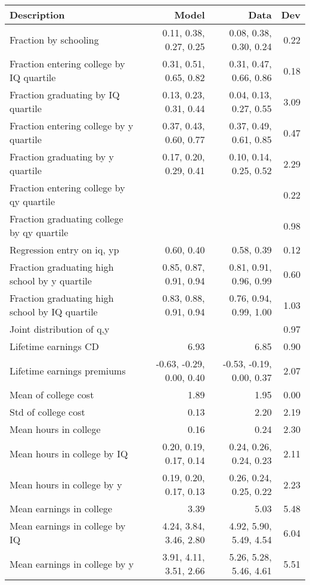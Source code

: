 \begin{tabular}{lrrr}
\hline
Description & Model  & Data  & Dev  \\ 
\hline
Fraction by schooling & 0.11, 0.38, 0.27, 0.25  & 0.08, 0.38, 0.30, 0.24  & 0.22  \\ 
Fraction entering college by IQ quartile & 0.31, 0.51, 0.65, 0.82  & 0.31, 0.47, 0.66, 0.86  & 0.18  \\ 
Fraction graduating by IQ quartile & 0.13, 0.23, 0.31, 0.44  & 0.04, 0.13, 0.27, 0.55  & 3.09  \\ 
Fraction entering college by y quartile & 0.37, 0.43, 0.60, 0.77  & 0.37, 0.49, 0.61, 0.85  & 0.47  \\ 
Fraction graduating by y quartile & 0.17, 0.20, 0.29, 0.41  & 0.10, 0.14, 0.25, 0.52  & 2.29  \\ 
Fraction entering college by qy quartile &   &   & 0.22  \\ 
Fraction graduating college by qy quartile &   &   & 0.98  \\ 
Regression entry on iq, yp & 0.60, 0.40  & 0.58, 0.39  & 0.12  \\ 
Fraction graduating high school by y quartile & 0.85, 0.87, 0.91, 0.94  & 0.81, 0.91, 0.96, 0.99  & 0.60  \\ 
Fraction graduating high school by IQ quartile & 0.83, 0.88, 0.91, 0.94  & 0.76, 0.94, 0.99, 1.00  & 1.03  \\ 
Joint distribution of q,y &   &   & 0.97  \\ 
Lifetime earnings CD & 6.93  & 6.85  & 0.90  \\ 
Lifetime earnings premiums & -0.63, -0.29, 0.00, 0.40  & -0.53, -0.19, 0.00, 0.37  & 2.07  \\ 
Mean of college cost & 1.89  & 1.95  & 0.00  \\ 
Std of college cost & 0.13  & 2.20  & 2.19  \\ 
Mean hours in college & 0.16  & 0.24  & 2.30  \\ 
Mean hours in college by IQ & 0.20, 0.19, 0.17, 0.14  & 0.24, 0.26, 0.24, 0.23  & 2.11  \\ 
Mean hours in college by y & 0.19, 0.20, 0.17, 0.13  & 0.26, 0.24, 0.25, 0.22  & 2.23  \\ 
Mean earnings in college & 3.39  & 5.03  & 5.48  \\ 
Mean earnings in college by IQ & 4.24, 3.84, 3.46, 2.80  & 4.92, 5.90, 5.49, 4.54  & 6.04  \\ 
Mean earnings in college by y & 3.91, 4.11, 3.51, 2.66  & 5.26, 5.28, 5.46, 4.61  & 5.51  \\ 

\end{tabular}
